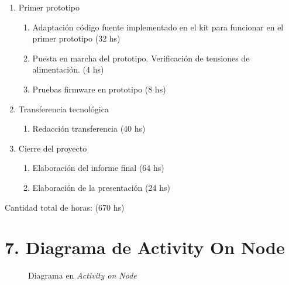 \documentclass[11pt]{charter}
\begin{document}
\begin{enumerate}
\item Primer prototipo
	\begin{enumerate}
	\item Adaptación código fuente implementado en el kit para funcionar en el primer prototipo (32 hs)
	\item Puesta en marcha del prototipo. Verificación de tensiones de alimentación. (4 hs)
	\item Pruebas firmware en prototipo (8 hs)
	\end{enumerate}	
\item Transferencia tecnológica
	\begin{enumerate}
	\item Redacción transferencia (40 hs)
	\end{enumerate}		
\item Cierre del proyecto
	\begin{enumerate}
	\item Elaboración del informe final (64 hs)
	\item Elaboración de la presentación (24 hs)
	\end{enumerate}					
\end{enumerate}

Cantidad total de horas: (670 hs)




\section{7. Diagrama de Activity On Node}
\label{sec:AoN}


\begin{figure}[htpb]
\centering 
{}
\caption{Diagrama en \textit{Activity on Node}}
\label{fig:AoN}
\end{figure}
\end{document}

